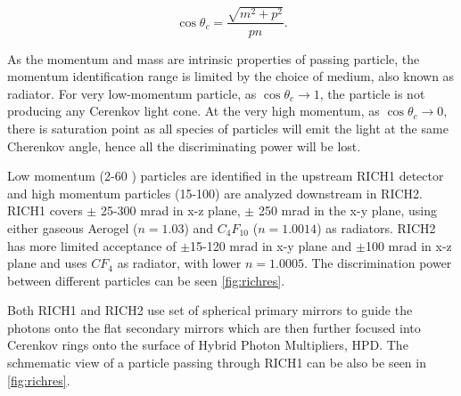 \begin{equation}
	\cos\theta_{c} =  \frac{\sqrt{m^{2} + p^{2}}}{pn}.
\end{equation}

As the momentum and mass are intrinsic properties of passing particle, the momentum identification range is limited by the choice of medium, also known as radiator. For very low-momentum particle, as $\cos\theta_{c} \rightarrow 1$, the particle is not producing any Cerenkov light cone. At the very high momentum, as $\cos\theta_{c} \rightarrow 0$, there is saturation point as all species of particles will emit the light at the same Cherenkov angle, hence all the discriminating power will be lost.

Low momentum (2-60 \gev) particles are identified in the upstream RICH1 detector and high momentum particles (15-100) \gev are analyzed downstream in RICH2. RICH1 covers $\pm$ 25-300 mrad in x-z plane, $\pm$ 250 mrad in the x-y plane, using either gaseous Aerogel ($n=1.03$) and $C_{4}F_{10}$ ($n = 1.0014$) as radiators. RICH2 has more limited acceptance of $\pm$15-120 mrad in x-y plane and $\pm$100 mrad in x-z plane and uses $CF_{4}$ as radiator, with lower $n=1.0005$. The discrimination power between different particles can be seen \autoref{fig:richres}. 


Both RICH1 and RICH2 use set of spherical primary mirrors to guide the photons onto the flat secondary mirrors which are then further focused into Cerenkov rings onto the surface of Hybrid Photon Multipliers, \Gls{HPD}. The schmematic view of a particle passing through RICH1 can be also be seen in \autoref{fig:richres}. 


